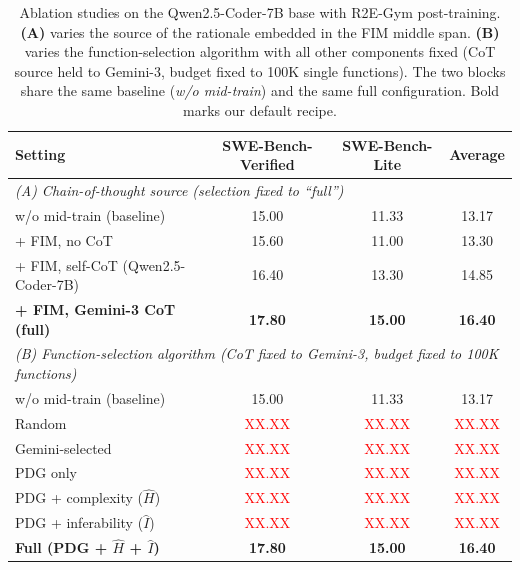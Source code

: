 \begin{table}[t]
\centering
\caption{Ablation studies on the Qwen2.5-Coder-7B base with R2E-Gym
post-training. \textbf{(A)} varies the source of the rationale embedded in
the FIM middle span. \textbf{(B)} varies the function-selection algorithm
with all other components fixed (CoT source held to Gemini-3, budget
fixed to 100K single functions). The two blocks share the same baseline
(\emph{w/o mid-train}) and the same full configuration. Bold marks our
default recipe.}
\label{tab:ablation}
\small
\setlength{\tabcolsep}{8pt}
\begin{tabular}{lccc}
\toprule
Setting & SWE-Bench-Verified & SWE-Bench-Lite & Average \\
\midrule
\multicolumn{4}{l}{\emph{(A) Chain-of-thought source (selection fixed to ``full'')}} \\
\midrule
w/o mid-train (baseline)            & 15.00 & 11.33 & 13.17 \\
+ FIM, no CoT                       & 15.60 & 11.00 & 13.30 \\
+ FIM, self-CoT (Qwen2.5-Coder-7B)  & 16.40 & 13.30 & 14.85 \\
\textbf{+ FIM, Gemini-3 CoT (full)} & \textbf{17.80} & \textbf{15.00} & \textbf{16.40} \\
\midrule
\multicolumn{4}{l}{\emph{(B) Function-selection algorithm (CoT fixed to Gemini-3, budget fixed to 100K functions)}} \\
\midrule
w/o mid-train (baseline)               & 15.00 & 11.33 & 13.17 \\
Random                                 & \textcolor{red}{XX.XX} & \textcolor{red}{XX.XX} & \textcolor{red}{XX.XX} \\
Gemini-selected                        & \textcolor{red}{XX.XX} & \textcolor{red}{XX.XX} & \textcolor{red}{XX.XX} \\
PDG only                               & \textcolor{red}{XX.XX} & \textcolor{red}{XX.XX} & \textcolor{red}{XX.XX} \\
PDG + complexity ($\hat{H}$)           & \textcolor{red}{XX.XX} & \textcolor{red}{XX.XX} & \textcolor{red}{XX.XX} \\
PDG + inferability ($\hat{I}$)         & \textcolor{red}{XX.XX} & \textcolor{red}{XX.XX} & \textcolor{red}{XX.XX} \\
\textbf{Full (PDG + $\hat{H}$ + $\hat{I}$)} & \textbf{17.80} & \textbf{15.00} & \textbf{16.40} \\
\bottomrule
\end{tabular}
\end{table}


